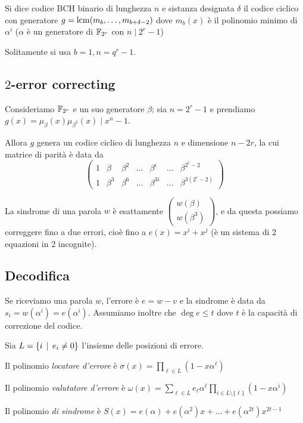 \documentclass[a4paper]{book}
\begin{document}
    \begin{definition}
        Si dice codice BCH binario di lunghezza $n$ e sistanza designata $\delta$ il codice ciclico con generatore $g=\operatorname{lcm}(m_b,\dots,m_{b+\delta-2})$ dove $m_b(x)$ è il polinomio minimo di $\alpha^i$ ($\alpha$ è un generatore di $\mathbb{F}_{2^r}$ con $n\mid 2^r-1$)
    \end{definition}

    Solitamente si usa $b=1, n=q^r-1$.

    \subsection{$2$-error correcting}
    Consideriamo $\mathbb{F}_{2^r}$ e un suo generatore $\beta$; sia $n=2^r-1$ e prendiamo $g(x)=\mu_\beta(x)\mu_{\beta^3}(x)\mid x^n-1$.

    Allora $g$ genera un codice ciclico di lunghezza $n$ e dimensione $n-2r$, la cui matrice di parità è data da $$\begin{pmatrix}
    1 & \beta & \beta^2 & \dots & \beta^i & \dots & \beta^{2^r-2}\\
    1 & \beta^3 & \beta^6 & \dots & \beta^{3i} & \dots & \beta^{3(2^r-2)}
    \end{pmatrix}$$

    La sindrome di una parola $w$ è esattamente $\begin{pmatrix}
    w(\beta) \\ w(\beta^3)
    \end{pmatrix}$, e da questa possiamo correggere fino a due errori, cioè fino a $e(x)=x^i+x^j$ (è un sistema di 2 equazioni in 2 incognite).

    \subsection{Decodifica}
    Se riceviamo una parola $w$, l'errore è $e=w-v$ e la sindrome è data da $s_i=w(\alpha^i)=e(\alpha^i)$. Assumiamo inoltre che $\deg e\le t$ dove $t$ è la capacità di correzione del codice.

    \begin{definition}
        Sia $L=\{ i\operatorname{\; |\;} e_i\neq0 \}$ l'insieme delle posizioni di errore.

        Il polinomio \emph{locatore d'errore} è $\sigma(x)=\prod_{\ell\in L}(1-x\alpha^\ell)$

        Il polinomio \emph{valutatore d'errore} è $\omega(x)=\sum_{\ell \in L}e_\ell\alpha^\ell \prod_{i\in L\setminus\{\ell\}}(1-x\alpha^i)$

        Il polinomio \emph{di sindrome} è $S(x)=e(\alpha)+e(\alpha^2)x+\dots+e(\alpha^{2t})x^{2t-1}$
    \end{definition}
\end{document}
